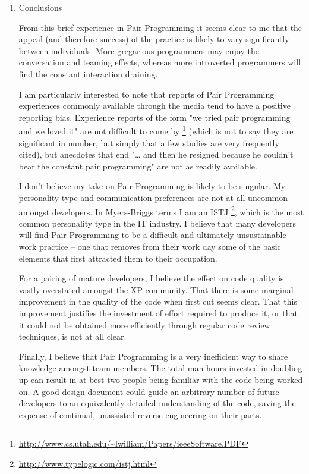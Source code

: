 \documentclass{article}
\begin{document}
\begin{enumerate}
\item Conclusions
\label{sec:orgheadline213}

From this brief experience in Pair Programming it seems clear to me that
the appeal (and therefore success) of the practice is likely to vary
significantly between individuals. More gregarious programmers may enjoy
the conversation and teaming effects, whereas more introverted
programmers will find the constant interaction draining.

I am particularly interested to note that reports of Pair Programming
experiences commonly available through the media tend to have a positive
reporting bias. Experience reports of the form "we tried pair
programming and we loved it" are not difficult to come by \footnote{\url{http://www.cs.utah.edu/~lwilliam/Papers/ieeeSoftware.PDF}} (which is
not to say they are significant in number, but simply that a few studies
are very frequently cited), but anecdotes that end "\ldots{} and then he
resigned because he couldn't bear the constant pair programming" are not
as readily available.

I don't believe my take on Pair Programming is likely to be singular. My
personality type and communication preferences are not at all uncommon
amongst developers. In Myers-Briggs terms I am an ISTJ \footnote{\url{http://www.typelogic.com/istj.html}}, which is
the most common personality type in the IT industry. I believe that many
developers will find Pair Programming to be a difficult and ultimately
unsustainable work practice -- one that removes from their work day some
of the basic elements that first attracted them to their occupation.

For a pairing of mature developers, I believe the effect on code quality
is vastly overstated amongst the XP community. That there is some
marginal improvement in the quality of the code when first cut seems
clear. That this improvement justifies the investment of effort required
to produce it, or that it could not be obtained more efficiently through
regular code review techniques, is not at all clear.

Finally, I believe that Pair Programming is a very inefficient way to
share knowledge amongst team members. The total man hours invested in
doubling up can result in at best two people being familiar with the
code being worked on. A good design document could guide an arbitrary
number of future developers to an equivalently detailed understanding of
the code, saving the expense of continual, unassisted reverse
engineering on their parts.


\end{enumerate}
\end{document}
